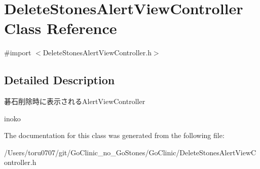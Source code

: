 \hypertarget{interface_delete_stones_alert_view_controller}{
\section{DeleteStonesAlertViewController Class Reference}
\label{interface_delete_stones_alert_view_controller}
}


{\ttfamily \#import $<$DeleteStonesAlertViewController.h$>$}



\subsection{Detailed Description}
碁石削除時に表示されるAlertViewController

inoko 

The documentation for this class was generated from the following file:\begin{DoxyCompactItemize}
\item 
/Users/toru0707/git/GoClinic\_\-no\_\-GoStones/GoClinic/DeleteStonesAlertViewController.h\end{DoxyCompactItemize}
